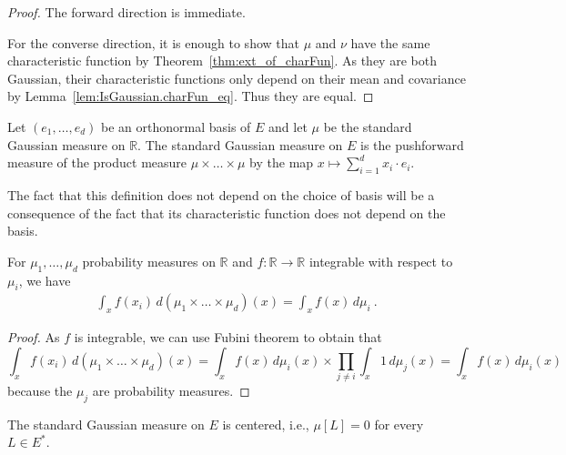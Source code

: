 \begin{proof}\leanok
The forward direction is immediate.

For the converse direction, it is enough to show that $\mu$ and $\nu$ have the same characteristic function by Theorem~\ref{thm:ext_of_charFun}. As they are both Gaussian, their characteristic functions only depend on their mean and covariance by Lemma~\ref{lem:IsGaussian.charFun_eq}. Thus they are equal.
\end{proof}


\begin{definition}\label{def:stdGaussian}
  \leanok
Let $(e_1, \ldots, e_d)$ be an orthonormal basis of $E$ and let $\mu$ be the standard Gaussian measure on $\mathbb{R}$.
The standard Gaussian measure on $E$ is the pushforward measure of the product measure $\mu \times \ldots \times \mu$ by the map $x \mapsto \sum_{i=1}^d x_i \cdot e_i$.
\end{definition}

The fact that this definition does not depend on the choice of basis will be a consequence of the fact that its characteristic function does not depend on the basis.


\begin{lemma}\label{lem:integral_eval_pi}
  \leanok
For $\mu_1, \ldots, \mu_d$ probability measures on $\mathbb{R}$ and $f : \mathbb{R} \to \mathbb{R}$ integrable with respect to $\mu_i$, we have
\begin{align*}
  \int_x f(x_i) \, d(\mu_1 \times \ldots \times \mu_d)(x)
  = \int_x f(x) \, d\mu_i
  \: .
\end{align*}
\end{lemma}

\begin{proof}\leanok
As $f$ is integrable, we can use Fubini theorem to obtain that
$$\int_x f(x_i) \, d(\mu_1 \times \ldots \times \mu_d)(x) = \int_x f(x) \, d\mu_i(x) \times \prod_{j \ne i} \int_x 1 \, d\mu_j(x) = \int_x f(x) \, d\mu_i(x)$$
because the $\mu_j$ are probability measures.
\end{proof}


\begin{lemma}\label{lem:isCentered_stdGaussian}
  \leanok
The standard Gaussian measure on $E$ is centered, i.e., $\mu[L] = 0$ for every $L \in E^*$.
\end{lemma}

